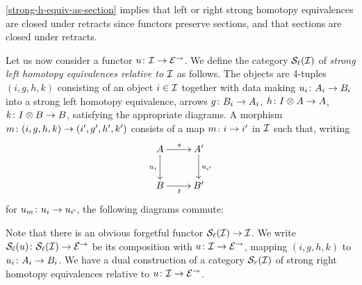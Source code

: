 \documentclass[reqno,10pt,a4paper,oneside]{amsart}
\begin{document}
\cref{strong-h-equiv-as-section} implies that left or right strong homotopy equivalences are closed under retracts 
since functors preserve sections, and that  sections are closed under retracts.

\medskip





  


Let us now consider a functor $u \co \cal{I} \to \catE^{\to}$. We define the category $\cal{S}_\ell(\cal{I})$ of \emph{strong left homotopy equivalences relative to $\cal{I}$} as follows. The objects are  4-tuples $(i, g,h,k)$ consisting of an object $i \in \cal{I}$ together with data making $u_i \co A_i \to B_i$ into a strong left homotopy equivalence,
\ie arrows $g \co B_i \to A_i$, $h \co \interval \otimes A \to A$, $k \co \interval \otimes B \to B$, satisfying the appropriate diagrams.
A morphism $m \co (i,g, h, k) \to (i', g', h', k')$ consists of a map $m \co i \to i'$ in $\cal{I}$ such that, writing 
\[
\xymatrix{
A \ar[d]_{u_i}  \ar[r]^s & A' \ar[d]^{u_{i'}} \\
B \ar[r]_t & B'}
\]
for $u_m \co u_i \to u_{i'}$, the following diagrams commute:
Note that there is an obvious forgetful functor $\cal{S}_\ell(\cal{I}) \to \cal{I}$. We write $\cal{S}_\ell(u) \co \cal{S}_\ell(\cal{I}) \to \catE^{\to}$ be its composition with $u \co \cal{I} \to \catE^{\to}$, mapping $(i, g,h,k)$ to $u_i \co A_i \to B_i$. We have a dual construction of a category $\cal{S}_r(\cal{I})$ of strong right homotopy equivalences relative to  $u \co \cal{I} \to \catE^{\to}$.
\end{document}
